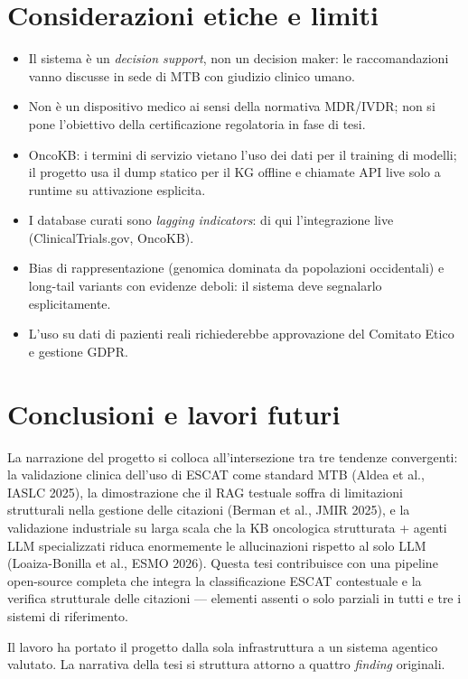 \documentclass[11pt,a4paper]{article}
\begin{document}
\section{Considerazioni etiche e limiti}
\begin{itemize}
\item Il sistema \`e un \emph{decision support}, non un decision maker: le raccomandazioni vanno discusse in sede di MTB con giudizio clinico umano.
\item Non \`e un dispositivo medico ai sensi della normativa MDR/IVDR; non si pone l'obiettivo della certificazione regolatoria in fase di tesi.
\item OncoKB: i termini di servizio vietano l'uso dei dati per il training di modelli; il progetto usa il dump statico per il KG offline e chiamate API live solo a runtime su attivazione esplicita.
\item I database curati sono \emph{lagging indicators}: di qui l'integrazione live (ClinicalTrials.gov, OncoKB).
\item Bias di rappresentazione (genomica dominata da popolazioni occidentali) e long-tail variants con evidenze deboli: il sistema deve segnalarlo esplicitamente.
\item L'uso su dati di pazienti reali richiederebbe approvazione del Comitato Etico e gestione GDPR.
\end{itemize}

\section{Conclusioni e lavori futuri}
La narrazione del progetto si colloca all'intersezione tra tre tendenze convergenti: la validazione clinica dell'uso di ESCAT come standard MTB (Aldea et al., IASLC 2025), la dimostrazione che il RAG testuale soffra di limitazioni strutturali nella gestione delle citazioni (Berman et al., JMIR 2025), e la validazione industriale su larga scala che la KB oncologica strutturata + agenti LLM specializzati riduca enormemente le allucinazioni rispetto al solo LLM (Loaiza-Bonilla et al., ESMO 2026). Questa tesi contribuisce con una pipeline open-source completa che integra la classificazione ESCAT contestuale e la verifica strutturale delle citazioni --- elementi assenti o solo parziali in tutti e tre i sistemi di riferimento.

Il lavoro ha portato il progetto dalla sola infrastruttura a un sistema agentico valutato. La narrativa della tesi si struttura attorno a quattro \emph{finding} originali.
\end{document}
